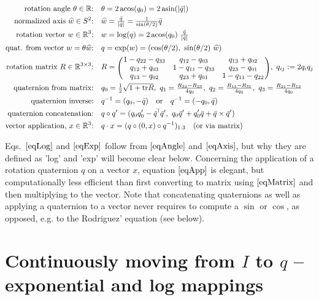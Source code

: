 $$\begin{align}
\text{rotation angle $\t\in\RRR$:} \quad \label{eqAngle}
& \t = 2 \acos(q_0) = 2\, \text{asin}(|\bar q|) \\
\text{normalized axis $\ul w\in S^2$:} \quad \label{eqAxis}
& \ul w = \Frac{\bar q}{|\bar q|} = \Frac{1}{\sin(\t/2)} \bar q \\
\text{rotation vector $w\in\RRR^3$:} \quad \label{eqLog}
& w = \log(q) = 2 \acos(q_0)~ \Frac{\bar q}{|\bar q|}  \\
\text{quat. from vector $w=\t\ul w$:} \quad \label{eqExp}
& q = \exp(w) = (\cos(\t/2),~ \sin(\t/2)~ \ul w) \\
\text{rotation matrix $R\in\RRR^{3\times 3}$:} \quad \label{eqMatrix}
& R
= \mat{ccc}{
    1-q_{22}-q_{33} & q_{12}-q_{03} &    q_{13}+q_{02} \\
    q_{12}+q_{03} &   1-q_{11}-q_{33} &  q_{23}-q_{01} \\
    q_{13}-q_{02} &   q_{23}+q_{01} &    1-q_{11}-q_{22}
    },~ q_{ij} := 2 q_i q_j \\
\text{quaternion from matrix:} \quad
& q_0 = \Frac12 \sqrt{1+\tr R},~
  q_1 = \Frac{R_{32}-R_{23}}{4 q_0},~
  q_2 = \Frac{R_{13}-R_{31}}{4 q_0},~
  q_3 = \Frac{R_{21}-R_{12}}{4 q_0}  \\
\text{quaternion inverse:} \quad
& q^{-1} = (q_0,-\bar q) \quad \text{or} \quad  q^{-1} = (-q_0, \bar q) \\
\text{quaternion concatenation:} \quad &
q \circ q'
 = (q_0 q'_0 - \bar q^\T \bar q',~
    q_0 \bar q' + q'_0 \bar q + \bar q \times \bar q') \\
\text{vector application, $x\in\RRR^3$:} \quad \label{eqApp}
& q \cdot x = (q \circ (0,x) \circ q^{-1})_{1:3} \quad\text{(or via matrix)}
\end{align}$$

Eqs.~$\eqref{eqLog}$ and $\eqref{eqExp}$ follow from $\eqref{eqAngle}$
and $\eqref{eqAxis}$, but why they are defined as 'log' and 'exp' will become clear below. Concerning the application of a rotation quaternion $q$ on a vector
$x$, equation $\eqref{eqApp}$ is elegant, but computationally less
efficient than first converting to matrix using $\eqref{eqMatrix}$ and
then multiplying to the vector. Note that concatenating quaternions as
well as applying a quaternion to a vector never requires to compute
a $\sin$ or $\cos$, as opposed, e.g. to the Rodriguez' equation
(see below).

\section{Continuously moving from $I$ to $q$ -- exponential and log mappings}

